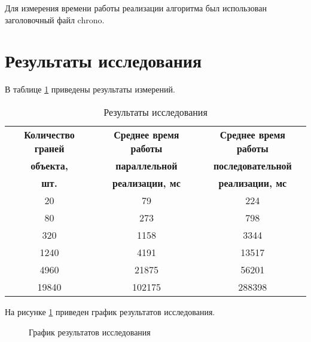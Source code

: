 Для измерения времени работы реализации алгоритма был использован заголовочный файл chrono.

\section{Результаты исследования}

В таблице \ref{restable} приведены результаты измерений.

\begin{table}[H]
	\begin{center}
		\caption{\label{restable}Результаты исследования}
		\begin{tabular}{|c|c|c|}
			\hline
			\bf{Количество граней} & \bf{Среднее время работы} & \bf{Среднее время работы}\\
			\bf{объекта,} & \bf{параллельной} & \bf{последовательной}\\
			\bf{шт.} & \bf{реализации, мс} & \bf{реализации, мс}\\
			\hline
			20 & 79 & 224\\
			\hline
			80 & 273 & 798\\
			\hline
			320 & 1158 & 3344\\
			\hline
			1240 & 4191 & 13517\\
			\hline
			4960 & 21875 & 56201\\
			\hline
			19840 & 102175 & 288398\\
			\hline
		\end{tabular}
	\end{center}
\end{table}

На рисунке \ref{resgraph} приведен график результатов исследования.

\begin{figure}[H]
	\begin{center}
		\caption{\label{resgraph}График результатов исследования}
	\end{center}
\end{figure}



